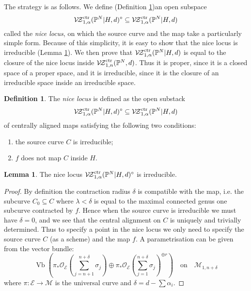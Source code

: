 \documentclass[11pt]{amsart}
\newcommand{\PP}{\mathbb P}
\newcommand{\VZc}[4]{\mathcal{V\!Z}^{\rm{ctr}}_{#1,#2}(#3,#4)}
\newcommand{\OO}{\mathcal{O}}
\renewcommand{\to}{\rightarrow}
\theoremstyle{definition}
\newtheorem{lem}[thm]{Lemma}
\theoremstyle{definition}
\newtheorem{definition}[thm]{Definition}
\begin{document}
The strategy is as follows. We define (Definition \ref{Definition of nice locus})an open subspace
\begin{equation*}\VZc{1}{\alpha}{\PP^N|H}{d}^{\circ} \subseteq \VZc{1}{\alpha}{\PP^N|H}{d}\end{equation*}
called the \emph{nice locus}, on which the source curve and the map take a particularly simple form. Because of this simplicity, it is easy to show that the nice locus is irreducible (Lemma \ref{Nice locus is irreducible}). We then prove that $\VZc{1}{\alpha}{\PP^N|H}{d}$ is equal to the closure of the nice locus inside $\VZc{1}{n}{\PP^N}{d}$. Thus it is proper, since it is a closed space of a proper space, and it is irreducible, since it is the closure of an irreducible space inside an irreducible space.

\begin{definition} \label{Definition of nice locus} The \emph{nice locus} is defined as the open substack
\begin{equation*}\VZc{1}{\alpha}{\PP^N|H}{d}^{\circ} \subseteq \VZc{1}{\alpha}{\PP^N|H}{d}\end{equation*}
of centrally aligned maps satisfying the following two conditions:
\begin{enumerate}
\item the source curve $C$ is irreducible;
\item $f$ does not map $C$ inside $H$.
\end{enumerate}
\end{definition}

\begin{lem}\label{Nice locus is irreducible}
The nice locus $\VZc{1}{\alpha}{\PP^N|H}{d}^{\circ}$ is irreducible.
\end{lem}
\begin{proof}
By definition the contraction radius $\delta$ is compatible with the map, i.e. the subcurve $C_0\subseteq C$ where $\lambda<\delta$ is equal to the maximal connected genus one subcurve contracted by $f$. Hence when the source curve is irreducible we must have $\delta=0$, and we see that the central alignment on $C$ is uniquely and trivially determined. Thus to specify a point in the nice locus we only need to specify the source curve $C$ (as a scheme) and the map $f$. A parametrisation can be given from the vector bundle:
\[ \operatorname{Vb}\left(\pi_*\OO_{\mathcal E}(\sum_{j=n+1}^{n+\delta}\sigma_j)\oplus\pi_*\OO_{\mathcal E}(\sum_{j=1}^{n+\delta}\sigma_j)^{\oplus r}\right) \quad \text{on} \quad \mathcal{M}_{1,n+\delta}\]
where $\pi\colon\mathcal E\to\mathcal M$ is the universal curve and $\delta=d-\sum\alpha_i$.
\end{proof}
\end{document}
